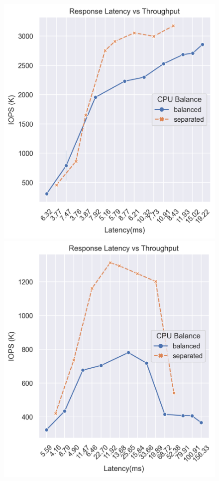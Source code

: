 \begin{figure}[!ht]
  \centering
  \begin{minipage}{.5\textwidth}
  \centering
    \includegraphics[width=\textwidth]{msgr_crimson_bal_vs_sep_client_des_rc.png}
  \end{minipage}%
  \begin{minipage}{.5\textwidth}
  \centering
    \includegraphics[width=\textwidth]{msgr_async_bal_vs_sep_client_des_rc.png}

\end{minipage}
\end{figure}
